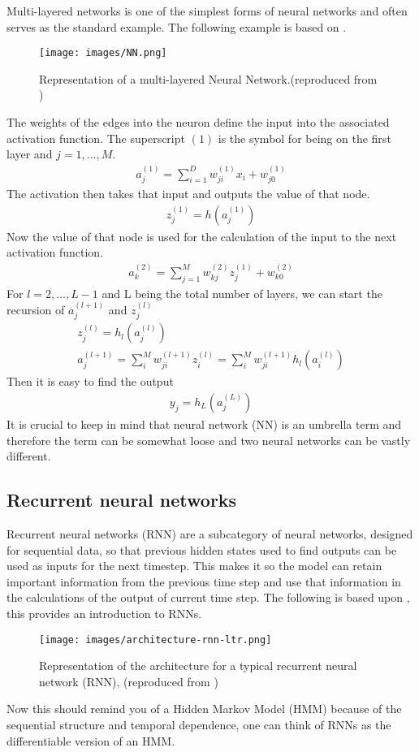 \documentclass[a4paper,12pt]{article}
\begin{document}
Multi-layered networks is one of the simplest forms of neural networks and often serves as the standard example. The following example is based on \cite{bishop2024deep}.
\begin{figure}[H]
  \centering
  \texttt{[image: images/NN.png]}
  \caption{Representation of a multi-layered Neural Network.(reproduced from \cite{bishop2024deep})} %
  \label{fig:n2}
\end{figure}
The weights of the edges into the neuron define the input into the associated activation function. The superscript $(1)$ is the symbol for being on the first layer and $j=1,\dots, M$.
\begin{align}
  a^{(1)}_j = \sum_{i=1}^{D} w^{(1)}_{ji} x_i + w^{(1)}_{j0}
\end{align}
The activation then takes that input and outputs the value of that node.
\begin{align}
  z_j^{(1)} = h\left(a_j^{(1)}\right)
\end{align}
Now the value of that node is used for the calculation of the input to the next activation function.
\begin{align}
  a_k^{(2)} = \sum_{j=1}^{M} w_{kj}^{(2)} z_j^{(1)} + w_{k0}^{(2)}
\end{align}
For $l=2,\dots,L-1$ and L being the total number of layers, we can start the recursion of $a_j^{(l+1)}$ and $z_j^{(l)} $
\begin{align}
z_j^{(l)} = h_l\left(a_j^{(l)}\right) \\
a_j^{(l+1)} = \sum_i^M w_{ji}^{(l+1)} z_i^{(l)} = \sum_i^M w_{ji}^{(l+1)} h_l\left(a_i^{(l)}\right)
\end{align}
Then it is easy to find the output
\begin{align}
  y_j = h_L\left(a_j^{(L)}\right)
\end{align}
It is crucial to keep in mind that neural network (NN) is an umbrella term and therefore the term can be somewhat loose and two neural networks can be vastly different.
\subsection{Recurrent neural networks}
Recurrent neural networks (RNN) are a subcategory of neural networks, designed for sequential data, so that previous hidden states used to find outputs can be used as inputs for the next timestep.
This makes it so the model can retain important information from the previous time step and use that information in the calculations of the output of current time step. 
The following is based upon \cite{amidi_rnn_cheatsheet}, this provides an introduction to RNNs.
\begin{figure}[H]
  \centering
  \texttt{[image: images/architecture-rnn-ltr.png]}
  \caption{Representation of the architecture for a typical recurrent neural network (RNN), (reproduced from \cite{amidi_rnn_cheatsheet})} %
  \label{fig:n3}
\end{figure}
Now this should remind you of a Hidden Markov Model (HMM) because of the sequential structure and temporal dependence, one can think of RNNs as the differentiable version of an HMM.
\end{document}
